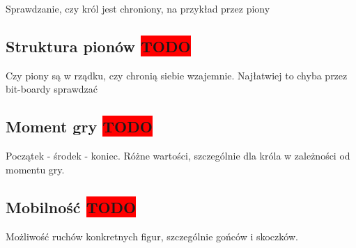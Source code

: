 {
    \color{red}
    \large Sprawdzanie, czy król jest chroniony, na przykład przez piony
}

\subsection{Struktura pionów \colorbox{red}{TODO}}
\label{subsec:struktura-pionow}

{
    \color{red}
    \large Czy piony są w rządku, czy chronią siebie wzajemnie.
Najłatwiej to chyba przez bit-boardy sprawdzać
}


\subsection{Moment gry \colorbox{red}{TODO}}
\label{subsec:moment-gry}

{
    \color{red}
    \large Początek - środek - koniec.
    Różne wartości, szczególnie dla króla w zależności od momentu gry.
}


\subsection{Mobilność \colorbox{red}{TODO}}
\label{subsec:mobilnosc}

{
    \color{red}
    \large Możliwość ruchów konkretnych figur, szczególnie gońców i skoczków.
}
